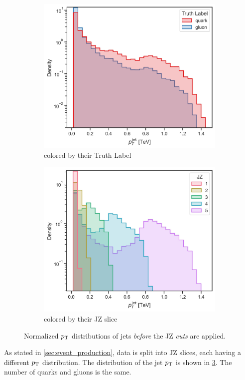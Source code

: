 \begin{figure}[htb]
    \centering
    \begin{subfigure}[t]{0.49\textwidth}
        \centering
        \includegraphics[width=\linewidth]{src/plots/pt_jet_label.jpg}
        \caption{colored by their Truth Label}
        \label{fig:jz_all_label}
    \end{subfigure}
    \begin{subfigure}[t]{0.49\textwidth}
        \centering
        \includegraphics[width=\linewidth]{src/plots/pt_jet_jz.jpg}
        \caption{colored by their JZ slice}
        \label{fig:jz_all_jz}
    \end{subfigure}
    \caption{Normalized $p_\text{T}$ distributions of jets \emph{before} the JZ \emph{cuts} are applied.}
    \label{fig:jz_all}
\end{figure}
As stated in \cref{sec:event_production}, data is split into JZ slices, each having a different $p_\text{T}$ distribution.
The distribution of the jet $p_\text{T}$ is shown in \cref{fig:jz_all}.
The number of quarks and gluons is the same.

